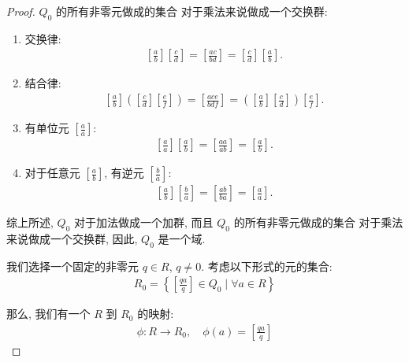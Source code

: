 \documentclass[utf8]{ctexbook}
\theoremstyle{definition}
\begin{document}
\begin{proof}
$Q_0$ 的所有非零元做成的集合 对于乘法来说做成一个交换群:
\begin{enumerate}
\item{交换律:
\begin{align*}
\left[ \frac{a}{b} \right] \left[ \frac{c}{d} \right] = \left[ \frac{ac }{bd} \right] = \left[ \frac{c}{d} \right] \left[ \frac{a}{b} \right] .
\end{align*}
}
\item{结合律:
\begin{align*}
\left[ \frac{a}{b} \right]  \left(\left[ \frac{c}{d} \right]  \left[ \frac{e}{f} \right]  \right) = \left[ \frac{ac e}{b d f} \right]  = \left( \left[ \frac{a}{b} \right]  \left[ \frac{c}{d} \right] \right) \left[ \frac{e}{f} \right] .
\end{align*}
}
\item{有单位元 $ \left[ \frac{a}{a} \right] $:
\begin{align*}
\left[ \frac{a}{a} \right] \left[ \frac{a}{b} \right] = \left[ \frac{aa }{ab} \right] = \left[ \frac{a}{b} \right] .
\end{align*}
}
\item{对于任意元 $\left[ \frac{a}{b} \right] $, 有逆元 $\left[ \frac{b}{a} \right] $:
\begin{align*}
\left[ \frac{a}{b} \right] \left[ \frac{b}{a} \right] = \left[ \frac{ab}{ba} \right] = \left[ \frac{a}{a} \right] .
\end{align*}
}
\end{enumerate}

综上所述, $Q_0$ 对于加法做成一个加群, 而且 $Q_0$ 的所有非零元做成的集合 对于乘法来说做成一个交换群, 因此, $Q_0$ 是一个域.

我们选择一个固定的非零元 $ q \in R$, $q \neq 0$. 考虑以下形式的元的集合:
\begin{align*}
R_0 = \left\{ \left[ \frac{q a}{q} \right] \in Q_0 \mid \forall a \in R  \right\} 
\end{align*} 

那么, 我们有一个 $R$ 到 $R_0$ 的映射:
\begin{align*}
\phi: R \longrightarrow R_0, \quad \phi(a) = \left[ \frac{q a}{q} \right]
\end{align*}


\end{proof}
\end{document}
